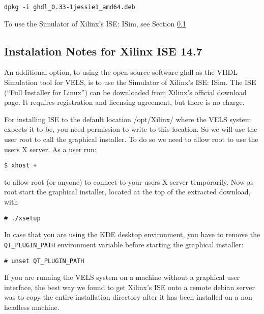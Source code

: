 \begin{verbatim}
dpkg -i ghdl_0.33-1jessie1_amd64.deb
\end{verbatim}

To use the Simulator of Xilinx's ISE: ISim, see Section \ref{ISE-install}


\subsection{Instalation Notes for Xilinx ISE 14.7}\label{ISE-install}

An additional option, to using the open-source software ghdl as the VHDL Simulation tool for VELS, is to use the Simulator of Xilinx's ISE: ISim. The ISE (``Full Installer for Linux'') can be downloaded from Xilinx's official download page. It requires registration and licensing agreement, but there is no charge.

For installing ISE to the default location /opt/Xilinx/ where the VELS system expects it to be, you need permission to write to this location. So we will use the user root to call the graphical installer. To do so we need to allow root to use the users X server. As a user run:

\begin{verbatim}
$ xhost +
\end{verbatim}

to allow root (or anyone) to connect to your users X server temporarily. Now as root start the graphical installer, located at the top of the extracted download, with

\begin{verbatim}
# ./xsetup
\end{verbatim}

In case that you are using the KDE desktop environment, you have to remove the \verb!QT_PLUGIN_PATH! environment variable before starting the graphical installer:

\begin{verbatim}
# unset QT_PLUGIN_PATH
\end{verbatim}

If you are running the VELS system on a machine without a graphical user interface, the best way we found to get Xilinx's ISE onto a remote debian server was to copy the entire installation directory after it has been installed on a non-headless machine.
